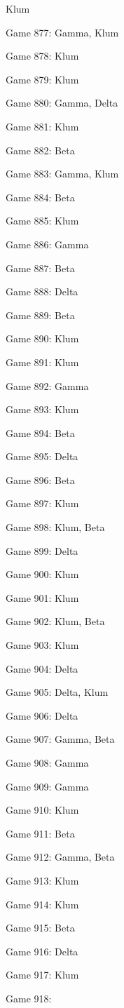 \documentclass{article}
\begin{document}
\begin{multicols}{3}
\begin{compactitem}
Klum
\item Game 877:
Gamma, Klum
\item Game 878:
Klum
\item Game 879:
Klum
\item Game 880:
Gamma, Delta
\item Game 881:
Klum
\item Game 882:
Beta
\item Game 883:
Gamma, Klum
\item Game 884:
Beta
\item Game 885:
Klum
\item Game 886:
Gamma
\item Game 887:
Beta
\item Game 888:
Delta
\item Game 889:
Beta
\item Game 890:
Klum
\item Game 891:
Klum
\item Game 892:
Gamma
\item Game 893:
Klum
\item Game 894:
Beta
\item Game 895:
Delta
\item Game 896:
Beta
\item Game 897:
Klum
\item Game 898:
Klum, Beta
\item Game 899:
Delta
\item Game 900:
Klum
\item Game 901:
Klum
\item Game 902:
Klum, Beta
\item Game 903:
Klum
\item Game 904:
Delta
\item Game 905:
Delta, Klum
\item Game 906:
Delta
\item Game 907:
Gamma, Beta
\item Game 908:
Gamma
\item Game 909:
Gamma
\item Game 910:
Klum
\item Game 911:
Beta
\item Game 912:
Gamma, Beta
\item Game 913:
Klum
\item Game 914:
Klum
\item Game 915:
Beta
\item Game 916:
Delta
\item Game 917:
Klum
\item Game 918:

\end{compactitem}
\end{multicols}
\end{document}
